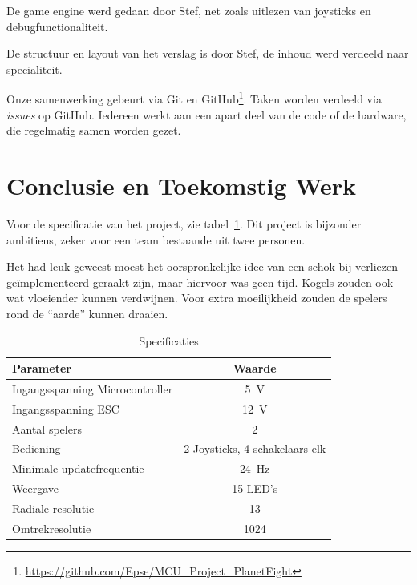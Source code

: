 \documentclass[12pt]{ugentreport}
\begin{document}
De game engine werd gedaan door Stef,
net zoals uitlezen van joysticks en debugfunctionaliteit.

De structuur en layout van het verslag is door Stef, de inhoud werd verdeeld
naar specialiteit.

Onze samenwerking gebeurt via Git en
GitHub\footnote{\url{https://github.com/Epse/MCU_Project_PlanetFight}}. Taken worden
verdeeld via \emph{issues} op GitHub. Iedereen werkt aan een apart deel van de
code of de hardware, die regelmatig samen worden gezet.

\section{Conclusie en Toekomstig Werk}
Voor de specificatie van het project, zie tabel~\ref{tbl:specs}.
Dit project is bijzonder ambitieus, zeker voor een team bestaande uit twee
personen.

Het had leuk geweest moest het oorspronkelijke idee van een schok bij verliezen
geïmplementeerd geraakt zijn, maar hiervoor was geen tijd. Kogels zouden ook wat
vloeiender kunnen verdwijnen. Voor extra moeilijkheid zouden de spelers rond  de
``aarde'' kunnen draaien.

\begin{table}
  \centering
  \begin{tabular}{l|c}
    \hline
    Parameter & Waarde\\
    \hline
    Ingangsspanning Microcontroller & \SI{5}{\volt}\\
    Ingangsspanning ESC & \SI{12}{\volt}\\
    Aantal spelers & 2\\
    Bediening & 2 Joysticks, 4 schakelaars elk\\
    Minimale updatefrequentie & \SI{24}{\hertz}\\
    Weergave & 15 LED's\\
    Radiale resolutie & 13\\
    Omtrekresolutie & 1024\\
    \hline
  \end{tabular}
  \caption{Specificaties}
  \label{tbl:specs}
\end{table}
\end{document}
